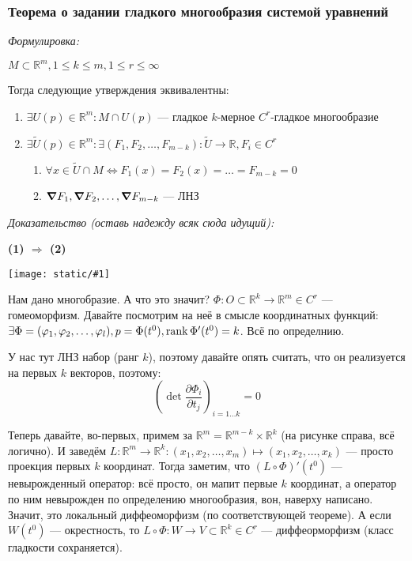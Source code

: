 \documentclass{article}
\def\image#1{\texttt{[image: static/\#1]}}
\begin{document}
\subsubsection{Теорема о задании гладкого многообразия системой уравнений}
\textit{Формулировка:}

$M \subset \mathbb{R}^m, 1 \le k \le m, 1 \le r \le \infty$

Тогда следующие утверждения эквивалентны:

\begin{enumerate}
    \item $\exists U(p) \in \mathbb{R}^m: M \cap U(p)$ --- гладкое $k$-мерное $C^r$-гладкое многообразие
    \item $\exists \widetilde{U}(p) \in \mathbb{R}^m: \exists (F_1, F_2, \ldots, F_{m - k}): \widetilde{U} \rightarrow \mathbb{R}, F_i \in C^r$ \begin{enumerate}
        \item $\forall x \in \widetilde{U} \cap M \Leftrightarrow F_1(x) = F_2(x) = \ldots = F_{m - k} = 0$
        \item $\grad F_1, \grad F_2, \ldots, \grad F_{m - k}$ --- ЛНЗ
    \end{enumerate}
\end{enumerate}
\textit{Доказательство (оставь надежду всяк сюда идущий):}

\textbf{(1) $\Rightarrow$ (2)}

\image{glad_mnogoobr.png}

Нам дано многобразие. А что это значит? $\Phi: O \subset \mathbb{R}^k \rightarrow \mathbb{R}^m \in C^r$ --- гомеоморфизм. Давайте посмотрим на неё в смысле координатных функций: $\exists \Phi = (\varphi_1, \varphi_2, \ldots, \varphi_l), p = \Phi(t^0), \rank \Phi'(t^0) = k$. Всё по определнию. 

У нас тут ЛНЗ набор (ранг $k$), поэтому давайте опять считать, что он реализуется на первых $k$ векторов, поэтому: 
\[\left(\det \frac{\partial \Phi_i}{\partial t_j}\right)_{i = 1 \ldots k} = 0\]

Теперь давайте, во-первых, примем за $\mathbb{R}^m = \mathbb{R}^{m - k} \times \mathbb{R}^k$ (на рисунке справа, всё логично). И заведём $L: \mathbb{R}^m \rightarrow \mathbb{R}^k: (x_1, x_2, \ldots, x_m) \mapsto (x_1, x_2, \ldots, x_k)$ --- просто проекция первых $k$ координат. Тогда заметим, что $(L \circ \Phi)'(t^0)$ --- невырожденный оператор: всё просто, он мапит первые $k$ координат, а оператор по ним невырожден по определению многообразия, вон, наверху написано. Значит, это локальный диффеоморфизм (по соответствующей теореме). А если $W(t^0)$ --- окрестность, то $L \circ \Phi: W \rightarrow V \subset \mathbb{R}^k \in C^r$ --- диффеорморфизм (класс гладкости сохраняется).
\end{document}
